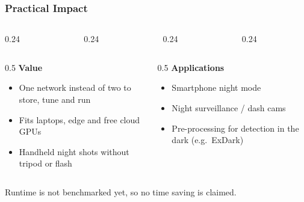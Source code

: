 \begin{frame}
    \frametitle{Practical Impact}

    \begin{columns}[t]
        \begin{column}{0.24\textwidth}\end{column}
        \begin{column}{0.24\textwidth}\end{column}
        \begin{column}{0.24\textwidth}\end{column}
        \begin{column}{0.24\textwidth}\end{column}
    \end{columns}
    \vspace{2mm}
    \begin{columns}[t]
        \begin{column}{0.5\textwidth}
            \small
            \textbf{Value}
            \begin{itemize}
                \item One network instead of two to store, tune and run
                \item Fits laptops, edge and free cloud GPUs
                \item Handheld night shots without tripod or flash
            \end{itemize}
        \end{column}
        \begin{column}{0.5\textwidth}
            \small
            \textbf{Applications}
            \begin{itemize}
                \item Smartphone night mode
                \item Night surveillance / dash cams
                \item Pre-processing for detection in the dark (e.g.\ ExDark)
            \end{itemize}
        \end{column}
    \end{columns}
    {\tiny Runtime is not benchmarked yet, so no time saving is claimed.}
\end{frame}
